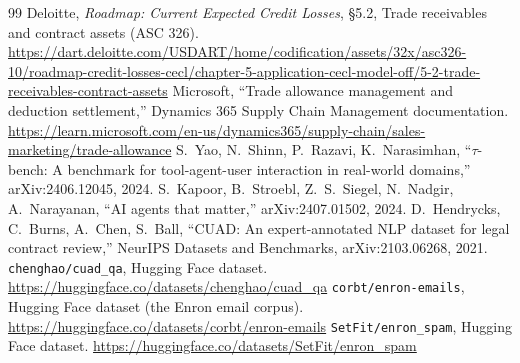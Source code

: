 \documentclass[10pt,letterpaper]{article}
\begin{document}
\begin{thebibliography}{99}
 Deloitte, \emph{Roadmap: Current Expected Credit Losses}, \S5.2, Trade receivables and contract assets (ASC 326). \url{https://dart.deloitte.com/USDART/home/codification/assets/32x/asc326-10/roadmap-credit-losses-cecl/chapter-5-application-cecl-model-off/5-2-trade-receivables-contract-assets}
 Microsoft, ``Trade allowance management and deduction settlement,'' Dynamics 365 Supply Chain Management documentation. \url{https://learn.microsoft.com/en-us/dynamics365/supply-chain/sales-marketing/trade-allowance}
 S.~Yao, N.~Shinn, P.~Razavi, K.~Narasimhan, ``$\tau$-bench: A benchmark for tool-agent-user interaction in real-world domains,'' arXiv:2406.12045, 2024.
 S.~Kapoor, B.~Stroebl, Z.~S.~Siegel, N.~Nadgir, A.~Narayanan, ``AI agents that matter,'' arXiv:2407.01502, 2024.
 D.~Hendrycks, C.~Burns, A.~Chen, S.~Ball, ``CUAD: An expert-annotated NLP dataset for legal contract review,'' NeurIPS Datasets and Benchmarks, arXiv:2103.06268, 2021.
 \texttt{chenghao/cuad\_qa}, Hugging Face dataset. \url{https://huggingface.co/datasets/chenghao/cuad_qa}
 \texttt{corbt/enron-emails}, Hugging Face dataset (the Enron email corpus). \url{https://huggingface.co/datasets/corbt/enron-emails}
 \texttt{SetFit/enron\_spam}, Hugging Face dataset. \url{https://huggingface.co/datasets/SetFit/enron_spam}
\end{thebibliography}
\endgroup
\end{document}
